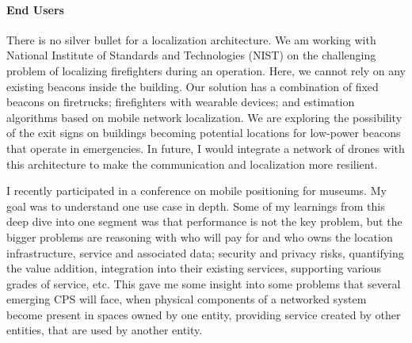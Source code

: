 \documentclass[10pt]{article}
\begin{document}

\paragraph{End Users} 
There is no silver bullet for a localization architecture. %
We am working with National Institute of Standards and Technologies (NIST) on the challenging problem of localizing firefighters during an operation. Here, we cannot rely on any existing beacons inside the building. Our solution has a combination of fixed beacons on firetrucks; firefighters with wearable devices; and estimation algorithms based on mobile network localization. We are exploring the possibility of the exit signs on buildings becoming potential locations for low-power beacons that operate in emergencies. In future, I would integrate a network of drones with this architecture to make the communication and localization more resilient.%

I recently participated in a conference on mobile positioning for museums. My goal was to understand one use case in depth. Some of my learnings from this deep dive into one segment was that performance is not the key problem, but the bigger problems are reasoning with who will pay for and who owns the location infrastructure, service and associated data; security and privacy risks, quantifying the value addition, integration into their existing services, supporting various grades of service, etc. This gave me some insight into some problems that several emerging CPS will face, when physical components of a networked system become present in spaces owned by one entity, providing service created by other entities, that are used by another entity. 
\end{document}
